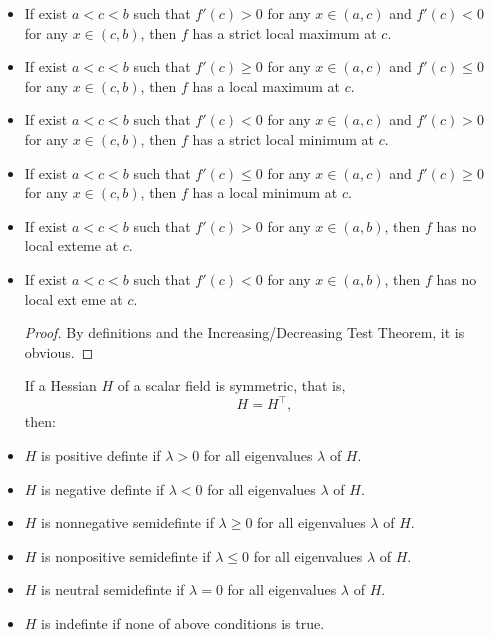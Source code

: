 \documentclass[a4paper,12pt]{report}
\begin{document}
\begin{itemize}
\begin{itemize}
\begin{proof}
    Take any two points $a,b\in J$ with $a<b$. By MVT, there exists $c\in (a,b)$ such that
    \[f'(c)=\frac{f(b)-f(a)}{b-a}.\]
    Because $f'(c)>0$ and $b-a>0$, we get $f(b)-f(a)>0$.

    Other statements can be proved similarly.
\end{proof}
Let $f\colon I\subseteq\mathbb{R}\to\mathbb{R}$ be a function, $c$ be a critical point of $f$, and $f'$ be continuous at $c$.
\bit
\item If exist $a<c<b$ such that $f'(c)>0$ for any $x\in (a,c)$ and $f'(c)<0$ for any $x\in (c,b)$, then $f$ has a strict local maximum at $c$.
\item If exist $a<c<b$ such that $f'(c)\geq 0$ for any $x\in (a,c)$ and $f'(c)\leq 0$ for any $x\in (c,b)$, then $f$ has a local maximum at $c$.
\item If exist $a<c<b$ such that $f'(c)<0$ for any $x\in (a,c)$ and $f'(c)>0$ for any $x\in (c,b)$, then $f$ has a strict local minimum at $c$.
\item If exist $a<c<b$ such that $f'(c)\leq 0$ for any $x\in (a,c)$ and $f'(c)\geq 0$ for any $x\in (c,b)$, then $f$ has a local minimum at $c$.
\item If exist $a<c<b$ such that $f'(c)>0$ for any $x\in (a,b)$, then $f$ has no local exteme at $c$.
\item If exist $a<c<b$ such that $f'(c)<0$ for any $x\in (a,b)$, then $f$ has no local ext
eme at $c$.
\eit
\begin{proof}
    By definitions and the Increasing/Decreasing Test Theorem, it is obvious.
\end{proof}
If a Hessian $H$ of a scalar field is symmetric, that is,
\[H=H^\top,\]
then:
\bit
\item $H$ is positive definte if $\lambda>0$ for all eigenvalues $\lambda$ of $H$.
\item $H$ is negative definte if $\lambda<0$ for all eigenvalues $\lambda$ of $H$.
\item $H$ is nonnegative semidefinte if $\lambda\geq 0$ for all eigenvalues $\lambda$ of $H$.
\item $H$ is nonpositive semidefinte if $\lambda\leq 0$ for all eigenvalues $\lambda$ of $H$.
\item $H$ is neutral semidefinte if $\lambda=0$ for all eigenvalues $\lambda$ of $H$.
\item $H$ is indefinte if none of above conditions is true.

\end{itemize}
\end{itemize}
\end{document}
